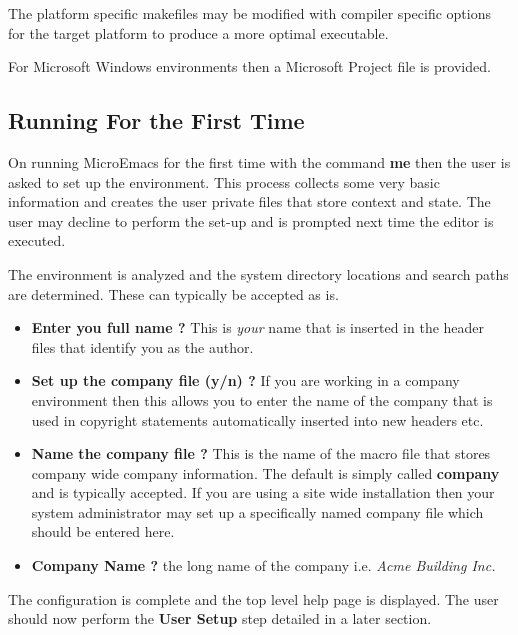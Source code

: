 \documentclass[11pt,a4paper,pdftex]{article}
\begin{document}

  The platform specific makefiles may be modified with compiler specific
  options for the target platform to produce a more optimal executable.

  For Microsoft Windows environments then a Microsoft Project file is
  provided.

\subsection{Running For the First Time}

  On running MicroEmacs for the first time with the command \textbf{me} then
  the user is asked to set up the environment. This process collects some very
  basic information and creates the user private files that store context and
  state. The user may decline to perform the set-up and is prompted next time
  the editor is executed.

  The environment is analyzed and the system directory locations and search
  paths are determined. These can typically be accepted as is.

  \begin{itemize}

    \item \textbf{Enter you full name ?} This is \textit{your} name that is
    inserted in the header files that identify you as the author.

    \item \textbf{Set up the company file (y/n) ?} If you are working in a
    company environment then this allows you to enter the name of the company
    that is used in copyright statements automatically inserted into new
    headers etc.

    \item \textbf{Name the company file ?} This is the name of the macro file
    that stores company wide company information. The default is simply called
    \textbf{company} and is typically accepted. If you are using a site wide
    installation then your system administrator may set up a specifically
    named company file which should be entered here.

    \item \textbf{Company Name ?} the long name of the company i.e.
    \textit{Acme Building Inc.}

  \end{itemize}

  The configuration is complete and the top level help page is displayed. The
  user should now perform the \textbf{User Setup} step detailed in a later
  section.
\end{document}
